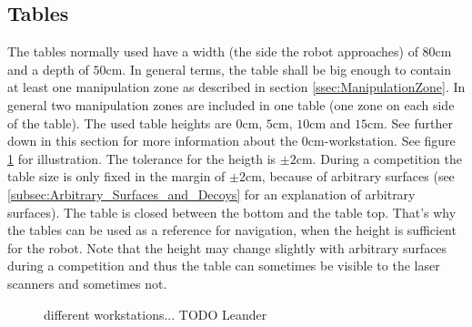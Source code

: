 \subsection{Tables}
\label{subsec: Tables}




The tables normally used have a width (the side the robot approaches) of $80\si{\centi\meter}$ and a depth of $50\si{\centi\meter}$. In general terms, the table shall be big enough to contain at least one manipulation zone as described in section \ref{ssec:ManipulationZone}. In general two manipulation zones are included in one table (one zone on each side of the table). The used table heights are $0\si{\centi\meter}$, $5\si{\centi\meter}$, $10\si{\centi\meter}$ and $15\si{\centi\meter}$. See further down in this section for more information about the $0\si{\centi\meter}$-workstation. See figure \ref{fig:ws} for illustration. 
The tolerance for the heigth is $\pm 2 \si{\centi\meter}$. During a competition the table size is only fixed in the margin of $\pm 2 \si{\centi\meter}$, because of arbitrary surfaces (see \ref{subsec:Arbitrary_Surfaces_and_Decoys} for an explanation of arbitrary surfaces). 
The table is closed between the bottom and the table top. That's why the tables can be used as a reference for navigation, when the height is sufficient for the robot. Note that the height may change slightly with arbitrary surfaces during a competition and thus the table can sometimes be visible to the laser scanners and sometimes not. 
 
\begin{figure} [h!]
	\begin{center}
		\missingfigure[figwidth=6cm]{}	
	\end{center}
	\caption{different workstations... TODO Leander}
	\label{fig:ws}
\end{figure}

